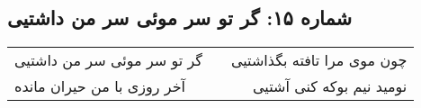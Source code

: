 \begin{center}
\section*{شماره ۱۵: گر تو سر موئی سر من داشتیی}
\label{sec:015}
\begin{longtable}{l p{0.5cm} r}
گر تو سر موئی سر من داشتیی
&&
چون موی مرا تافته بگذاشتیی
\\
آخر روزی با من حیران مانده
&&
نومید نیم بوکه کنی آشتیی
\\
\end{longtable}
\end{center}
